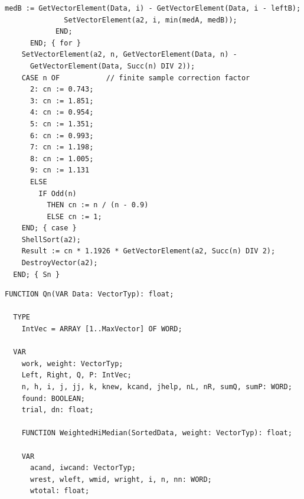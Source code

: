 \begin{refsection}
\begin{lstlisting}[caption= final Sn: \textbf{O}($n \log(n)$)]
              medB := GetVectorElement(Data, i) - GetVectorElement(Data, i - leftB);
              SetVectorElement(a2, i, min(medA, medB));
            END;
      END; { for }
    SetVectorElement(a2, n, GetVectorElement(Data, n) -
      GetVectorElement(Data, Succ(n) DIV 2));
    CASE n OF           // finite sample correction factor
      2: cn := 0.743;
      3: cn := 1.851;
      4: cn := 0.954;
      5: cn := 1.351;
      6: cn := 0.993;
      7: cn := 1.198;
      8: cn := 1.005;
      9: cn := 1.131
      ELSE
        IF Odd(n)
          THEN cn := n / (n - 0.9)
          ELSE cn := 1;
    END; { case }
    ShellSort(a2);
    Result := cn * 1.1926 * GetVectorElement(a2, Succ(n) DIV 2);
    DestroyVector(a2);
  END; { Sn }
\end{lstlisting}

\begin{lstlisting}[caption=Qn: doesn't give same result as naive Qn]
  FUNCTION Qn(VAR Data: VectorTyp): float;

  TYPE
    IntVec = ARRAY [1..MaxVector] OF WORD;

  VAR
    work, weight: VectorTyp;
    Left, Right, Q, P: IntVec;
    n, h, i, j, jj, k, knew, kcand, jhelp, nL, nR, sumQ, sumP: WORD;
    found: BOOLEAN;
    trial, dn: float;

    FUNCTION WeightedHiMedian(SortedData, weight: VectorTyp): float;

    VAR
      acand, iwcand: VectorTyp;
      wrest, wleft, wmid, wright, i, n, nn: WORD;
      wtotal: float;


\end{lstlisting}
\end{refsection}
